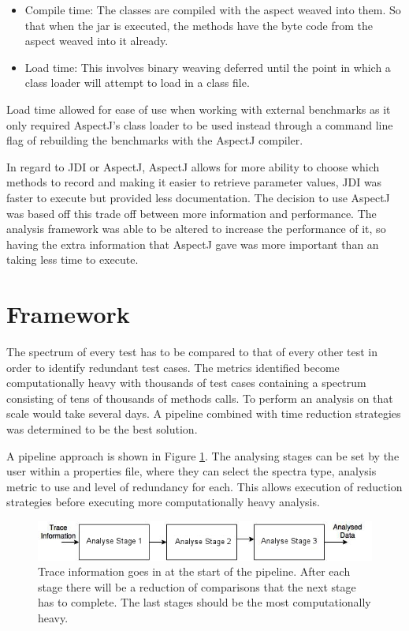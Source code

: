 \begin{itemize}
\item Compile time:
The classes are compiled with the aspect weaved into them. So that when the jar is executed, the methods have the byte code from the aspect weaved into it already.
\item Load time:
This involves binary weaving deferred until the point in which a class loader will attempt to load in a class file.
\end{itemize}

Load time allowed for ease of use when working with external benchmarks as it only required AspectJ's class loader to be used instead through a command line flag of rebuilding the benchmarks with the AspectJ compiler.

In regard to JDI or AspectJ, AspectJ allows for more ability to choose which methods to record and making it easier to retrieve parameter values, JDI was faster to execute but provided less documentation. The decision to use AspectJ was based off this trade off between more information and performance. The analysis framework was able to be altered to increase the performance of it, so having the extra information that AspectJ gave was more important than an taking less time to execute.

\section{Framework}
\label{S:framework}

The spectrum of every test has to be compared to that of every other test in order to identify redundant test cases. The metrics identified become computationally heavy with thousands of test cases containing a spectrum consisting of tens of thousands of methods calls. To perform an analysis on that scale would take several days. A pipeline combined with time reduction strategies was determined to be the best solution.

A pipeline approach is shown in Figure \ref{fig:pipeline}. The analysing stages can be set by the user within a properties file, where they can select the spectra type, analysis metric to use and level of redundancy for each. This allows execution of reduction strategies before executing more computationally heavy analysis.

\begin{figure}[h]
\includegraphics[width=\textwidth]{Pipeline.jpg}
\caption{Trace information goes in at the start of the pipeline. After each stage there will be a reduction of comparisons that the next stage has to complete. The last stages should be the most computationally heavy.}
\label{fig:pipeline}
\end{figure}

